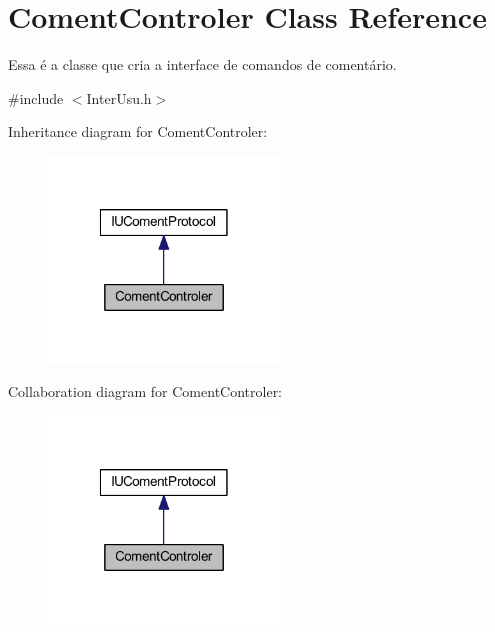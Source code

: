 \hypertarget{class_coment_controler}{\section{Coment\-Controler Class Reference}
\label{class_coment_controler}
}


Essa é a classe que cria a interface de comandos de comentário.  




{\ttfamily \#include $<$Inter\-Usu.\-h$>$}



Inheritance diagram for Coment\-Controler\-:\nopagebreak
\begin{figure}[H]
\begin{center}
\leavevmode
\includegraphics[width=174pt]{class_coment_controler__inherit__graph}
\end{center}
\end{figure}


Collaboration diagram for Coment\-Controler\-:\nopagebreak
\begin{figure}[H]
\begin{center}
\leavevmode
\includegraphics[width=174pt]{class_coment_controler__coll__graph}
\end{center}
\end{figure}

